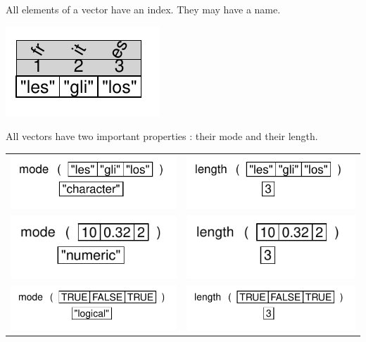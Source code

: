 \documentclass[pdflatex]{article}
\begin{document}
All elements of a vector have an index. They may have a name.

\includegraphics{v_char_names} 

All vectors have two important properties : their mode and their length.

\begin{tabular}{cc}
\includegraphics{v_char_type} & \includegraphics{v_char_length}\\
\includegraphics{v_num_type} & \includegraphics{v_num_length}\\
\includegraphics{v_log_type} & \includegraphics{v_log_length}\\
\end{tabular}
\end{document}
